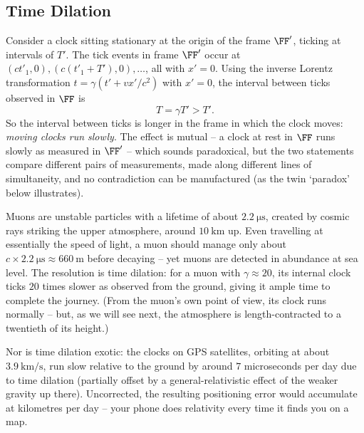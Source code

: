 \subsection{Time Dilation}

Consider a clock sitting stationary at the origin of the frame $\FF'$, ticking at intervals of $T'$. The tick events in frame $\FF'$ occur at $(ct'_1, 0), (c(t'_1 + T'), 0), \dots$, all with $x' = 0$. Using the inverse Lorentz transformation $t = \gamma(t' + vx'/c^2)$ with $x' = 0$, the interval between ticks observed in $\FF$ is
$$
T = \gamma T' > T'.
$$
So the interval between ticks is longer in the frame in which the clock moves: \emph{moving clocks run slowly}. The effect is mutual -- a clock at rest in $\FF$ runs slowly as measured in $\FF'$ -- which sounds paradoxical, but the two statements compare different pairs of measurements, made along different lines of simultaneity, and no contradiction can be manufactured (as the twin `paradox' below illustrates).

\begin{example}
	Muons are unstable particles with a lifetime of about $\SI{2.2}{\micro\second}$, created by cosmic rays striking the upper atmosphere, around $\SI{10}{\kilo\meter}$ up. Even travelling at essentially the speed of light, a muon should manage only about $c \times \SI{2.2}{\micro\second} \approx \SI{660}{\meter}$ before decaying -- yet muons are detected in abundance at sea level. The resolution is time dilation: for a muon with $\gamma \approx 20$, its internal clock ticks $20$ times slower as observed from the ground, giving it ample time to complete the journey. (From the muon's own point of view, its clock runs normally -- but, as we will see next, the atmosphere is length-contracted to a twentieth of its height.)

	Nor is time dilation exotic: the clocks on GPS satellites, orbiting at about $\SI{3.9}{\kilo\meter\per\second}$, run slow relative to the ground by around $7$ microseconds per day due to time dilation (partially offset by a general-relativistic effect of the weaker gravity up there). Uncorrected, the resulting positioning error would accumulate at kilometres per day -- your phone does relativity every time it finds you on a map.
\end{example}

